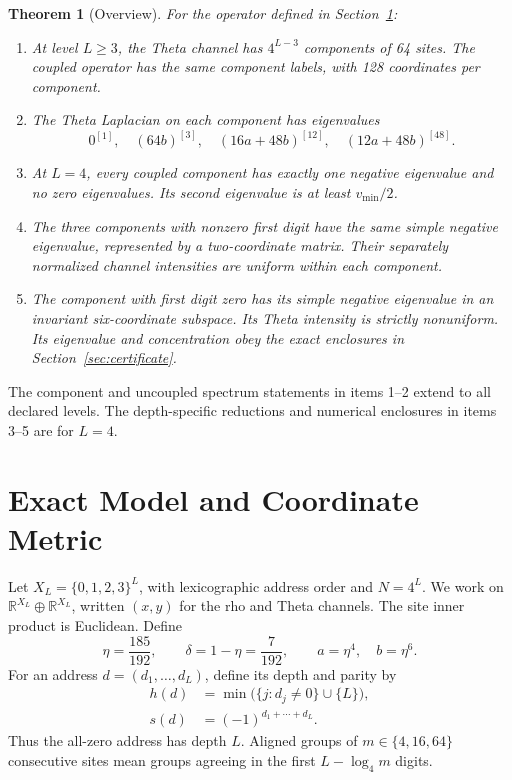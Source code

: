 \documentclass[journal,a4paper,10pt]{IEEEtran}
\newtheorem{theorem}{Theorem}
\theoremstyle{definition}\newtheorem{definition}[theorem]{Definition}
\theoremstyle{remark}\newtheorem{remark}[theorem]{Remark}
\newcommand{\R}{\mathbb R}
\begin{document}
\begin{theorem}[Overview]\label{thm:overview}
For the operator defined in Section~\ref{sec:model}:
\begin{enumerate}
\item At level $L\geq3$, the Theta channel has $4^{L-3}$ components of 64 sites. The coupled operator has the same component labels, with 128 coordinates per component.
\item The Theta Laplacian on each component has eigenvalues
\begin{equation}\label{eq:spectrum-summary}
0^{[1]},\quad (64b)^{[3]},\quad
(16a+48b)^{[12]},\quad (12a+48b)^{[48]}.
\end{equation}
\item At $L=4$, every coupled component has exactly one negative eigenvalue and no zero eigenvalues. Its second eigenvalue is at least $v_{\min}/2$.
\item The three components with nonzero first digit have the same simple negative eigenvalue, represented by a two-coordinate matrix. Their separately normalized channel intensities are uniform within each component.
\item The component with first digit zero has its simple negative eigenvalue in an invariant six-coordinate subspace. Its Theta intensity is strictly nonuniform. Its eigenvalue and concentration obey the exact enclosures in Section~\ref{sec:certificate}.
\end{enumerate}
\end{theorem}
The component and uncoupled spectrum statements in items 1--2 extend to all declared levels. The depth-specific reductions and numerical enclosures in items 3--5 are for $L=4$.

\section{Exact Model and Coordinate Metric}\label{sec:model}
Let $X_L=\{0,1,2,3\}^L$, with lexicographic address order and $N=4^L$. We work on $\R^{X_L}\oplus\R^{X_L}$, written $(x,y)$ for the rho and Theta channels. The site inner product is Euclidean. Define
\begin{equation}\label{eq:parameters}
\eta=\frac{185}{192},\qquad \delta=1-\eta=\frac7{192},
\qquad a=\eta^4,\quad b=\eta^6.
\end{equation}
For an address $d=(d_1,\ldots,d_L)$, define its depth and parity by
\begin{align}
h(d)&=\min\bigl(\{j:d_j\ne0\}\cup\{L\}\bigr),\label{eq:depth}\\
s(d)&=(-1)^{d_1+\cdots+d_L}.\label{eq:parity}
\end{align}
Thus the all-zero address has depth $L$. Aligned groups of $m\in\{4,16,64\}$ consecutive sites mean groups agreeing in the first $L-\log_4m$ digits.
\end{document}
